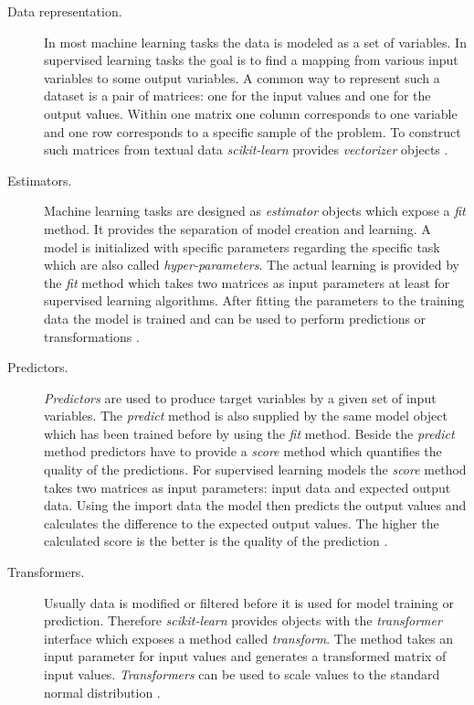 \begin{description}
  \item [Data representation.]
    In most machine learning tasks the data is modeled as a set of variables.
    In supervised learning tasks the goal is to find a mapping from various input variables to some output variables.
    A common way to represent such a dataset is a pair of matrices: one for the input values and one for the output values.
    Within one matrix one column corresponds to one variable and one row corresponds to a specific sample of the problem.
    To construct such matrices from textual data \emph{scikit-learn} provides \emph{vectorizer} objects
    \citep{buitinck2013api}.

  \item [Estimators.]
    Machine learning tasks are designed as \emph{estimator} objects which expose a \emph{fit} method.
    It provides the separation of model creation and learning.
    A model is initialized with specific parameters regarding the specific task which are also called \emph{hyper-parameters}.
    The actual learning is provided by the \emph{fit} method which takes two matrices as input parameters at least for supervised learning algorithms.
    After fitting the parameters to the training data the model is trained and can be used to perform predictions or transformations
    \citep{buitinck2013api}.

  \item [Predictors.]
    \emph{Predictors} are used to produce target variables by a given set of input variables.
    The \emph{predict} method is also supplied by the same model object which has been trained before by using the \emph{fit} method.
    Beside the \emph{predict} method predictors have to provide a \emph{score} method which quantifies the quality of the predictions.
    For supervised learning models the \emph{score} method takes two matrices as input parameters: input data and expected output data.
    Using the import data the model then predicts the output values and calculates the difference to the expected output values.
    The higher the calculated score is the better is the quality of the prediction
    \citep{buitinck2013api}.

  \item [Transformers.]
    Usually data is modified or filtered before it is used for model training or prediction.
    Therefore \emph{scikit-learn} provides objects with the \emph{transformer} interface which exposes a method called \emph{transform}.
    The method takes an input parameter for input values and generates a transformed matrix of input values.
    \emph{Transformers} can be used to scale values to the standard normal distribution
    \citep{buitinck2013api}.

\end{description}

